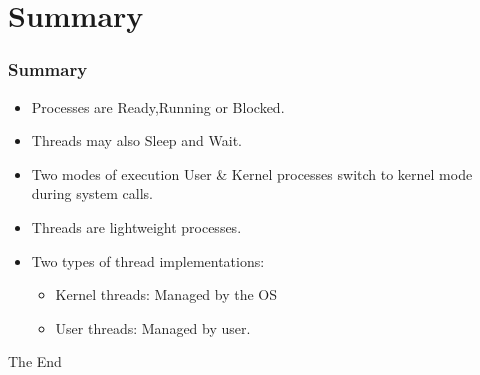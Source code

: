 \documentclass{beamer}
\begin{document}
\section{Summary}
\begin{frame}
\frametitle{Summary}
\begin{itemize}
\item Processes are Ready,Running or Blocked.
\item Threads may also Sleep and Wait.
\item Two modes of execution User \& Kernel processes switch to kernel mode during system calls.
\item Threads are lightweight processes.
\item Two types of thread implementations:
\begin{itemize}
\item Kernel threads: Managed by the OS
\item User threads: Managed by user.
\end{itemize}
\end{itemize}
\end{frame}

\begin{frame} 
\Huge{\centerline{The End}}
\end{frame}
\end{document}
